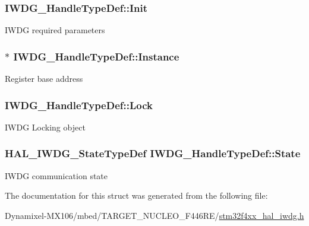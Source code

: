 \subsubsection[{\texorpdfstring{Init}{Init}}]{ I\+W\+D\+G\+\_\+\+Handle\+Type\+Def\+::\+Init}\hypertarget{struct_i_w_d_g___handle_type_def_ae308075a425af205912feb4059c6f213}{}\label{struct_i_w_d_g___handle_type_def_ae308075a425af205912feb4059c6f213}
I\+W\+DG required parameters 
\subsubsection[{\texorpdfstring{Instance}{Instance}}]{$\ast$ I\+W\+D\+G\+\_\+\+Handle\+Type\+Def\+::\+Instance}\hypertarget{struct_i_w_d_g___handle_type_def_ad3fd4c46ef1e9b842328ca4e3290708e}{}\label{struct_i_w_d_g___handle_type_def_ad3fd4c46ef1e9b842328ca4e3290708e}
Register base address 
\subsubsection[{\texorpdfstring{Lock}{Lock}}]{ I\+W\+D\+G\+\_\+\+Handle\+Type\+Def\+::\+Lock}\hypertarget{struct_i_w_d_g___handle_type_def_a89ec8a98b121ce7167707d4af23a822d}{}\label{struct_i_w_d_g___handle_type_def_a89ec8a98b121ce7167707d4af23a822d}
I\+W\+DG Locking object 
\subsubsection[{\texorpdfstring{State}{State}}]{ {\bf H\+A\+L\+\_\+\+I\+W\+D\+G\+\_\+\+State\+Type\+Def} I\+W\+D\+G\+\_\+\+Handle\+Type\+Def\+::\+State}\hypertarget{struct_i_w_d_g___handle_type_def_ad0e66d3745ab620bd7f6138880a8f299}{}\label{struct_i_w_d_g___handle_type_def_ad0e66d3745ab620bd7f6138880a8f299}
I\+W\+DG communication state 

The documentation for this struct was generated from the following file\+:\begin{DoxyCompactItemize}
\item 
Dynamixel-\/\+M\+X106/mbed/\+T\+A\+R\+G\+E\+T\+\_\+\+N\+U\+C\+L\+E\+O\+\_\+\+F446\+R\+E/\hyperlink{stm32f4xx__hal__iwdg_8h}{stm32f4xx\+\_\+hal\+\_\+iwdg.\+h}\end{DoxyCompactItemize}
